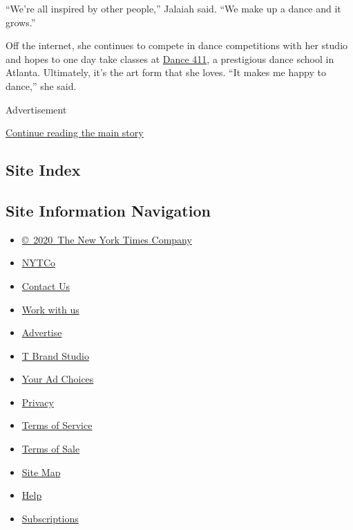 ``We're all inspired by other people,'' Jalaiah said. ``We make up a
dance and it grows.''

Off the internet, she continues to compete in dance competitions with
her studio and hopes to one day take classes at
\href{https://www.dance411.com/}{Dance 411}, a prestigious dance school
in Atlanta. Ultimately, it's the art form that she loves. ``It makes me
happy to dance,'' she said.

Advertisement

\protect\hyperlink{after-bottom}{Continue reading the main story}

\hypertarget{site-index}{%
\subsection{Site Index}\label{site-index}}

\hypertarget{site-information-navigation}{%
\subsection{Site Information
Navigation}\label{site-information-navigation}}

\begin{itemize}
\tightlist
\item
  \href{https://help.nytimes.com/hc/en-us/articles/115014792127-Copyright-notice}{©~2020~The
  New York Times Company}
\end{itemize}

\begin{itemize}
\tightlist
\item
  \href{https://www.nytco.com/}{NYTCo}
\item
  \href{https://help.nytimes.com/hc/en-us/articles/115015385887-Contact-Us}{Contact
  Us}
\item
  \href{https://www.nytco.com/careers/}{Work with us}
\item
  \href{https://nytmediakit.com/}{Advertise}
\item
  \href{http://www.tbrandstudio.com/}{T Brand Studio}
\item
  \href{https://www.nytimes.com/privacy/cookie-policy\#how-do-i-manage-trackers}{Your
  Ad Choices}
\item
  \href{https://www.nytimes.com/privacy}{Privacy}
\item
  \href{https://help.nytimes.com/hc/en-us/articles/115014893428-Terms-of-service}{Terms
  of Service}
\item
  \href{https://help.nytimes.com/hc/en-us/articles/115014893968-Terms-of-sale}{Terms
  of Sale}
\item
  \href{https://spiderbites.nytimes.com}{Site Map}
\item
  \href{https://help.nytimes.com/hc/en-us}{Help}
\item
  \href{https://www.nytimes.com/subscription?campaignId=37WXW}{Subscriptions}
\end{itemize}
